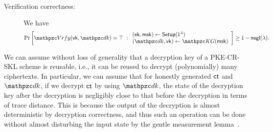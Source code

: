 \begin{definition}
\begin{description}
\item[Verification correctness:] We have 
\begin{align}
\Pr\left[
\qVrfy(\vk,\qdk)=\top
\ :
\begin{array}{ll}
(\ek,\msk)\gets\Setup(1^\secp)\\
(\qdk,\vk)\gets\qKG(\msk)
\end{array}
\right] 
\ge 1-\negl(\secp).
\end{align}
\end{description}
\end{definition}
\begin{remark}\label{rem:reusability}
We can assume without loss of generality that a decryption key of a PKE-CR-SKL scheme is reusable, i.e., it can be reused to decrypt (polynomially) many ciphertexts. In particular, we can assume that 
for honestly generated $\mathsf{ct}$ and $\qdk$, if we decrypt $\mathsf{ct}$ by using $\qdk$, the state of the decryption key after the decryption is negligibly close to that before the decryption in terms of trace distance. 
This is because the output of the decryption is almost deterministic by decryption correctness, and thus such an operation can be done without almost disturbing the input state by the gentle measurement lemma~\cite{Winter99}.    
\end{remark}

